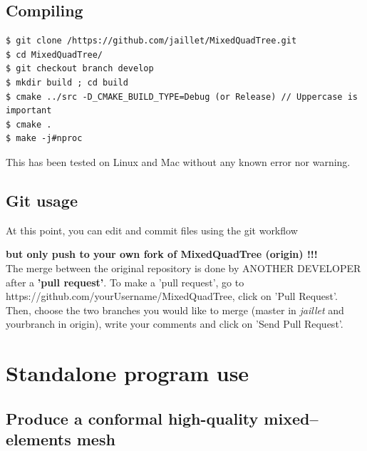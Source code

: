 \documentclass[10pt]{article}
\begin{document}
\subsection{Compiling}

{\small
\begin{verbatim}
$ git clone /https://github.com/jaillet/MixedQuadTree.git
$ cd MixedQuadTree/
$ git checkout branch develop
$ mkdir build ; cd build
$ cmake ../src -D_CMAKE_BUILD_TYPE=Debug (or Release) // Uppercase is important
$ cmake .
$ make -j#nproc
\end{verbatim}
}

This has been tested on Linux and Mac without any known error nor warning.

\subsection{Git usage}
At this point, you can edit and commit files using  the git workflow 
 
\textbf{but only push to your own fork of MixedQuadTree (origin) !!!}\\

The merge between the original repository is done by ANOTHER DEVELOPER after a \textbf{'pull request'}.
To make a 'pull request', go to https://github.com/yourUsername/MixedQuadTree, click on 'Pull Request'. Then, choose the two branches you would like to merge (master in \textit{jaillet} and yourbranch in origin), write your comments and click on 'Send Pull Request'.

\section{Standalone program use}
\label{standalone}

\subsection{Produce a conformal high-quality mixed--elements mesh}
\label{s:generatemesh}
\end{document}

